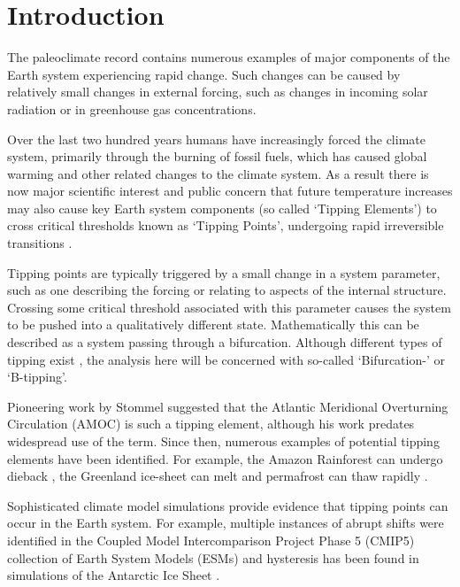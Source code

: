 \section{Introduction}\label{sec:introduction}
The paleoclimate record contains numerous examples \parencite{Brovkin2021} of 
major components of the Earth system experiencing rapid 
change. Such changes can be caused by 
relatively small changes in external forcing, such as changes in incoming
solar radiation or in greenhouse gas concentrations.

Over the last two hundred years humans have increasingly forced the climate system, 
primarily through the burning of fossil fuels,
which has caused global warming and other related changes to the climate
system. As a result there is now major scientific interest and public 
concern \parencite{Lenton2019a,Steffen2018,Ritchie2021} that future 
temperature increases may also cause key
Earth system components (so called `Tipping Elements')  to cross 
critical thresholds known as `Tipping Points', undergoing rapid 
irreversible transitions \parencite{Lenton2008}. 

Tipping points are typically triggered by a small change in a system parameter, such as one describing the forcing or
relating to aspects of the internal structure. Crossing some critical threshold associated with this parameter causes the system to be pushed into a qualitatively 
different state. Mathematically this can be described as a system passing through a bifurcation. 
Although different types of tipping exist \parencite{Ashwin2012}, the analysis here 
will be concerned with so-called `Bifurcation-' or `B-tipping'.


Pioneering work by Stommel suggested that the Atlantic Meridional Overturning 
Circulation (AMOC) \parencite{STOMMEL1961} is such a tipping element, although
his work predates widespread use of the term. Since then,
numerous examples of potential tipping elements have been identified.
For example, the Amazon Rainforest can undergo dieback \parencite{Cox2000}, the 
Greenland ice-sheet can melt \parencite{Feldmann2015} and
permafrost can thaw rapidly \parencite{Steffen2018}.

Sophisticated climate model simulations \parencite{Rahmstorf1995} provide evidence that tipping points can occur
in the Earth system. For example, multiple
instances of abrupt shifts were identified in the Coupled Model Intercomparison Project Phase 5 (CMIP5) \parencite{Taylor2012}
collection of Earth System Models (ESMs) \parencite{Drijfhout2015} and hysteresis has been found in 
simulations of the Antarctic Ice Sheet \parencite{Garbe2020}. 


